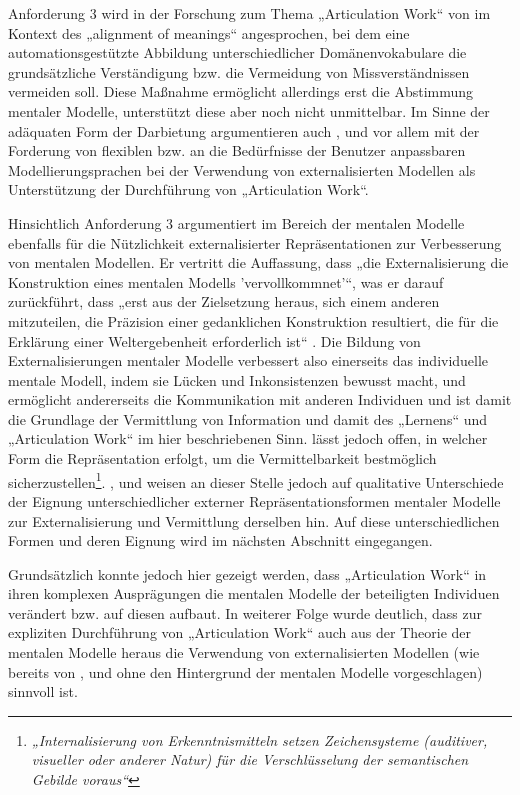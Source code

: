 Anforderung 3 wird in der Forschung zum Thema „Articulation Work“ von \citet{Sarini02} im Kontext des „alignment of meanings“ angesprochen, bei dem eine automationsgestützte Abbildung unterschiedlicher Domänenvokabulare die grundsätzliche Verständigung bzw. die Vermeidung von Missverständnissen vermeiden soll. Diese Maßnahme ermöglicht allerdings erst die Abstimmung mentaler Modelle, unterstützt diese aber noch nicht unmittelbar. Im Sinne der adäquaten Form der Darbietung argumentieren auch \citep{Divitini00}, \citep{Jorgensen04} und vor allem \citep{Herrmann02} mit der Forderung von flexiblen bzw. an die Bedürfnisse der Benutzer anpassbaren Modellierungsprachen bei der Verwendung von externalisierten Modellen als Unterstützung der Durchführung von „Articulation Work“. 

Hinsichtlich \wichtig Anforderung 3 argumentiert \citet{Seel91} im Bereich der mentalen Modelle ebenfalls für die Nützlichkeit externalisierter Repräsentationen zur Verbesserung von mentalen Modellen. Er vertritt die Auffassung, dass „die Externalisierung die Konstruktion eines mentalen Modells 'vervollkommnet'“, was er darauf zurückführt, dass „erst aus der Zielsetzung heraus, sich einem anderen mitzuteilen, die Präzision einer gedanklichen Konstruktion resultiert, die für die Erklärung einer Weltergebenheit erforderlich ist“ \citep[][S. 155]{Seel91}. Die Bildung von Externalisierungen mentaler Modelle verbessert also einerseits das individuelle mentale Modell, indem sie Lücken und Inkonsistenzen bewusst macht, und ermöglicht andererseits die Kommunikation mit anderen Individuen und ist damit die Grundlage der Vermittlung von Information und damit des „Lernens“ und „Articulation Work“ im hier beschriebenen Sinn. \citet{Seel91} lässt jedoch offen, in welcher Form die Repräsentation erfolgt, um die Vermittelbarkeit bestmöglich sicherzustellen\footnote{\emph{„Internalisierung von Erkenntnismitteln setzen Zeichensysteme (auditiver, visueller oder anderer Natur) für die Verschlüsselung der semantischen Gebilde voraus“}\citep[][S. 155]{Seel91}}. \citet{Ifenthaler06}, \citet{Hanke06} und \citep{Pirnay-Dummer06} weisen an dieser Stelle jedoch auf qualitative Unterschiede der Eignung unterschiedlicher externer Repräsentationsformen mentaler Modelle zur Externalisierung und Vermittlung derselben hin. Auf diese unterschiedlichen Formen und deren Eignung wird im nächsten Abschnitt eingegangen. 

Grundsätzlich konnte jedoch hier gezeigt werden, dass „Articulation Work“ in ihren komplexen Ausprägungen die mentalen Modelle der beteiligten Individuen verändert bzw. auf diesen aufbaut. In weiterer Folge wurde deutlich, dass zur expliziten Durchführung von „Articulation Work“ auch aus der Theorie der mentalen Modelle heraus die Verwendung von externalisierten Modellen (wie bereits von \citep{Divitini00}, \citep{Herrmann02} und \citep{Jorgensen04} ohne den Hintergrund der mentalen Modelle vorgeschlagen) sinnvoll ist.

